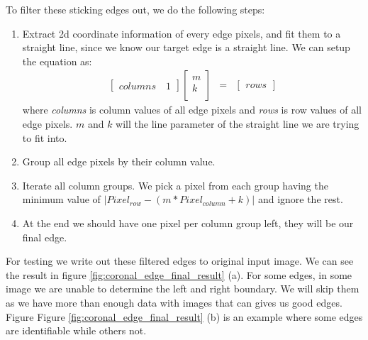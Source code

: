 To filter these sticking edges out, we do the following steps:

\begin{enumerate}
  \item Extract 2d coordinate information of every edge pixels, and fit them to a straight line, since we know
    our target edge is a straight line. We can setup the equation as:
    \begin{eqnarray}
      \begin{bmatrix}
        columns \quad 1
      \end{bmatrix}
      \begin{bmatrix}
        m\\
        k\\
      \end{bmatrix}
      & = & 
      \begin{bmatrix}
        rows
      \end{bmatrix}
    \end{eqnarray}
    where \emph{columns} is column values of all edge pixels and \emph{rows} is row values of all edge pixels.
    $m$ and $k$ will the line parameter of the straight line we are trying to fit into.
  \item Group all edge pixels by their column value.
  \item Iterate all column groups. We pick a pixel from each group having the minimum value of
    $|Pixel_{row} - (m*Pixel_{column} + k)|$ and ignore the rest.
  \item At the end we should have one pixel per column group left, they will be our final edge.
\end{enumerate}

For testing we write out these filtered edges to original input image. We can see the result in figure 
\ref{fig:coronal_edge_final_result} (a). For some edges, in some image we are unable to determine the left
and right boundary. We will skip them as we have more than enough data with images that can gives us good 
edges. Figure Figure \ref{fig:coronal_edge_final_result} (b) is an example where some edges are identifiable
while others not.


